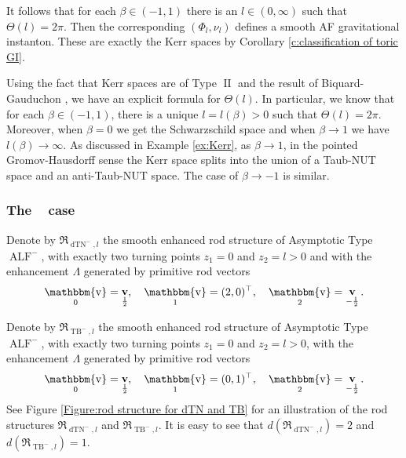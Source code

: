 \documentclass[a4paper,11pt]{amsart}
\theoremstyle{definition}
\numberwithin{equation}{section}
\newcommand{\mR} {\mathfrak R}
\DeclareMathOperator{\bbv}{\mathbbm{v}}
\DeclareMathOperator{\II}{II}
\DeclareMathOperator{\bv}{{\bf v}}
\DeclareMathOperator{\ALF}{ALF}
\DeclareMathOperator{\dTN}{dTN}
\DeclareMathOperator{\TB}{TB}
\DeclareMathOperator{\ALFm}{ALF^{--}}
\begin{document}
It follows that for each $\beta\in (-1,1)$ there is an $l\in (0,\infty)$ such that $\Theta(l)=2\pi$. Then the corresponding  $(\Phi_l, \nu_l)$ defines a smooth AF gravitational instanton. These are exactly the Kerr spaces by Corollary \ref{c:classification of toric GI}.

Using the fact that Kerr spaces are of Type $\II$ and the result of Biquard-Gauduchon \cite{BG}, we have an explicit formula for $\Theta(l)$. In particular, we know that for each $\beta\in (-1, 1)$, there is a unique $l=l(\beta)>0$ such that $\Theta(l)=2\pi$. Moreover, when $\beta=0$ we get the Schwarzschild space and when $\beta\rightarrow 1$ we have $l(\beta)\rightarrow\infty$. As discussed in Example \ref{ex:Kerr}, as $\beta\rightarrow 1$, in the pointed Gromov-Hausdorff sense the Kerr space splits into the union of a Taub-NUT space and an anti-Taub-NUT space.  The case of $\beta\to-1$ is similar.



\subsubsection{The \texorpdfstring{$\ALFm$}{} case}\label{sss:negative taub bolt}

Denote by  $\mR_{\dTN^{-}, l}$ the smooth enhanced rod structure of Asymptotic Type $\ALF^-$, with exactly two turning points $z_1=0$ and $z_2=l>0$ and with the enhancement $\Lambda$ generated by primitive rod vectors 
$$\bbv_0=\bv_{\frac12}, \quad \bbv_1=(2, 0)^{\top}, \quad \bbv_2=\bv_{-\frac12}.$$ 

Denote by  $\mR_{\TB^-, l}$ the smooth enhanced rod structure of Asymptotic Type $\ALF^-$, with exactly two turning points $z_1=0$ and $z_2=l>0$, with  the enhancement $\Lambda$ generated by primitive rod vectors 
$$\bbv_0=\bv_{\frac12}, \quad \bbv_1= (0, 1)^{\top}, \quad  \bbv_2=\bv_{-\frac12}.$$ 
See Figure \ref{Figure:rod structure for dTN and TB} for an illustration of  the rod structures $\mR_{\dTN^-,l}$ and $\mR_{\TB^-,l}$. It is easy to see that $d(\mR_{\dTN^-, l})=2$ and $d(\mR_{\TB^{-}, l})=1$.
\end{document}
